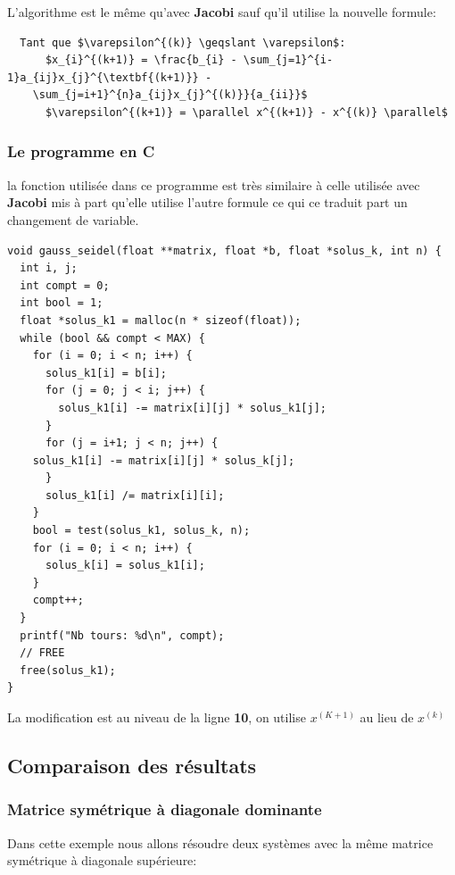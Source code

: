 \documentclass[a4paper]{article}
\begin{document}
L'algorithme est le même qu'avec \textbf{Jacobi} sauf qu'il utilise la nouvelle formule:

\begin{lstlisting}
  Tant que $\varepsilon^{(k)} \geqslant \varepsilon$:
      $x_{i}^{(k+1)} = \frac{b_{i} - \sum_{j=1}^{i-1}a_{ij}x_{j}^{\textbf{(k+1)}} -
    \sum_{j=i+1}^{n}a_{ij}x_{j}^{(k)}}{a_{ii}}$
      $\varepsilon^{(k+1)} = \parallel x^{(k+1)} - x^{(k)} \parallel$
\end{lstlisting}

\subsubsection{Le programme en C}

la fonction utilisée dans ce programme est très similaire à celle utilisée avec
\textbf{Jacobi} mis à part qu'elle utilise l'autre formule ce qui ce traduit
part un changement de variable.

\begin{lstlisting}
void gauss_seidel(float **matrix, float *b, float *solus_k, int n) {
  int i, j;
  int compt = 0;
  int bool = 1;
  float *solus_k1 = malloc(n * sizeof(float));
  while (bool && compt < MAX) {
    for (i = 0; i < n; i++) {
      solus_k1[i] = b[i];
      for (j = 0; j < i; j++) {
        solus_k1[i] -= matrix[i][j] * solus_k1[j];
      }
      for (j = i+1; j < n; j++) {
	solus_k1[i] -= matrix[i][j] * solus_k[j];
      }
      solus_k1[i] /= matrix[i][i];
    }
    bool = test(solus_k1, solus_k, n);
    for (i = 0; i < n; i++) {
      solus_k[i] = solus_k1[i];
    }
    compt++;
  }
  printf("Nb tours: %d\n", compt);
  // FREE
  free(solus_k1);
}
\end{lstlisting}

La modification est au niveau de la ligne \textbf{10}, on utilise $x^{(K+1)}$ au
lieu de $x^{(k)}$

\subsection{Comparaison des résultats}

\subsubsection{Matrice symétrique à diagonale dominante}

Dans cette exemple nous allons résoudre deux systèmes avec la même matrice
symétrique à diagonale supérieure:
\end{document}
